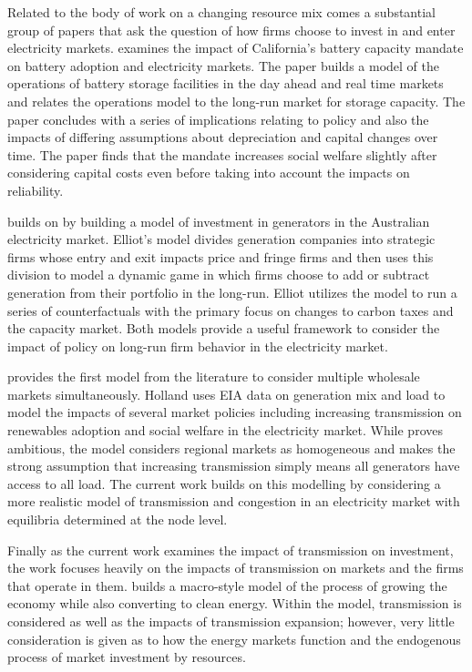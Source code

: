 \documentclass[12pt]{article}
\begin{document}
Related to the body of work on a changing resource mix comes a substantial group of papers that ask the question of how firms choose to invest in and enter electricity markets. \cite{butters2021soaking} examines the impact of California's battery capacity mandate on battery adoption and electricity markets. The paper builds a model of the operations of battery storage facilities in the day ahead and real time markets and relates the operations model to the long-run market for storage capacity. The paper concludes with a series of implications relating to policy and also the impacts of differing assumptions about depreciation and capital changes over time. The paper finds that the mandate increases social welfare slightly after considering capital costs even before taking into account the impacts on reliability. 

\cite{elliott2022investment} builds on \cite{butters2021soaking} by building a model of investment in generators in the Australian electricity market. Elliot's model divides generation companies into strategic firms whose entry and exit impacts price and fringe firms and then uses this division to model a dynamic game in which firms choose to add or subtract generation from their portfolio in the long-run. Elliot utilizes the model to run a series of counterfactuals with the primary focus on changes to carbon taxes and the capacity market. Both models provide a useful framework to consider the impact of policy on long-run firm behavior in the electricity market.

\cite{holland2022decarbonization} provides the first model from the literature to consider multiple wholesale markets simultaneously. Holland uses EIA data on generation mix and load to model the impacts of several market policies including increasing transmission on renewables adoption and social welfare in the electricity market. While \cite{holland2022decarbonization} proves ambitious, the model considers regional markets as homogeneous and makes the strong assumption that increasing transmission simply means all generators have access to all load. The current work builds on this modelling by considering a more realistic model of transmission and congestion in an electricity market with equilibria determined at the node level.

Finally as the current work examines the impact of transmission on investment, the work focuses heavily on the impacts of transmission on markets and the firms that operate in them. \cite{arkolakis2023clean} builds a macro-style model of the process of growing the economy while also converting to clean energy. Within the model, transmission is considered as well as the impacts of transmission expansion; however, very little consideration is given as to how the energy markets function and the endogenous process of market investment by resources.
\end{document}
